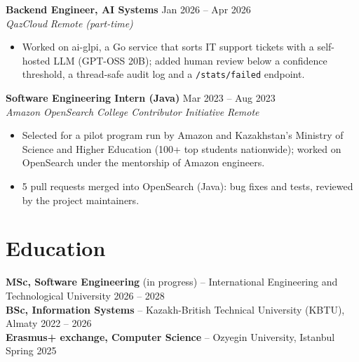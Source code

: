 \documentclass[10pt,a4paper]{article}
\newcommand{\resumeEntry}[4]{%
  \textbf{#1} \hfill #2\\
  \textit{#3} \hfill \textit{#4}\vspace{-2pt}
}
\begin{document}
\resumeEntry{Backend Engineer, AI Systems}{Jan 2026 -- Apr 2026}{QazCloud}{Remote (part-time)}
\begin{itemize}
  \item Worked on ai-glpi, a Go service that sorts IT support tickets with a self-hosted LLM (GPT-OSS 20B); added human review below a confidence threshold, a thread-safe audit log and a \texttt{/stats/failed} endpoint.
\end{itemize}

\resumeEntry{Software Engineering Intern (Java)}{Mar 2023 -- Aug 2023}{Amazon OpenSearch College Contributor Initiative}{Remote}
\begin{itemize}
  \item Selected for a pilot program run by Amazon and Kazakhstan's Ministry of Science and Higher Education (100+ top students nationwide); worked on OpenSearch under the mentorship of Amazon engineers.
  \item 5 pull requests merged into OpenSearch (Java): bug fixes and tests, reviewed by the project maintainers.
\end{itemize}

\section{Education}
\textbf{MSc, Software Engineering} (in progress) -- International Engineering and Technological University \hfill 2026 -- 2028\\
\textbf{BSc, Information Systems} -- Kazakh-British Technical University (KBTU), Almaty \hfill 2022 -- 2026\\
\textbf{Erasmus+ exchange, Computer Science} -- Ozyegin University, Istanbul \hfill Spring 2025
\end{document}
